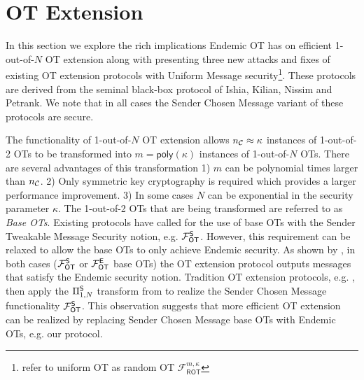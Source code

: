 


\section{OT Extension}


In this section we explore the rich implications Endemic OT has on efficient 1-out-of-$N$ OT extension along with presenting three new attacks and fixes of existing OT extension protocols\cite{C:KelOrsSch15, RSA:OrrOrsSch17} with Uniform Message security\footnote{\cite{C:KelOrsSch15, RSA:OrrOrsSch17} refer to uniform OT as random OT $\mathcal{F}^{m,\kappa}_{\textsf{ROT}}$}. These protocols are derived from the seminal black-box protocol of Ishia, Kilian, Nissim and Petrank\cite{C:IKNP03}. We note that in all cases the Sender Chosen Message variant of these protocols\cite{C:IKNP03, C:KelOrsSch15, RSA:OrrOrsSch17} are secure. %



The functionality of 1-out-of-$N$ OT extension allows ${n_\mathcal{C}}\approx\kappa$ instances of 1-out-of-2 OTs to be transformed into $m=\textsf{poly}(\kappa)$ instances of 1-out-of-$N$ OTs. There are several advantages of this transformation 1) $m$ can be polynomial times larger than ${n_\mathcal{C}}$. 2) Only symmetric key cryptography is required which provides a larger performance improvement. 3) In some cases $N$ can be exponential in the security parameter $\kappa$. The 1-out-of-2 OTs that are being transformed are referred to as \emph{Base OTs}. Existing protocols\cite{C:IKNP03,EC:ALSZ15, C:KelOrsSch15, RSA:OrrOrsSch17} have called for the use of base OTs with the Sender Tweakable Message Security notion, e.g. $\mathcal{F}_{\mathsf{OT}}^\mathsf{S}$. However, this requirement can be relaxed to allow the base OTs to only achieve Endemic security. As shown by , in both cases ($\mathcal{F}_{\mathsf{OT}}^\mathsf{S}$ or $\mathcal{F}_{\mathsf{OT}}^\mathsf{E}$ base OTs) the OT extension protocol outputs messages that satisfy the Endemic security notion.  Tradition OT extension protocols, e.g. \cite{C:IKNP03,EC:ALSZ15, C:KelOrsSch15}, then apply the $\Pi^{\mathsf{S}}_{1,N}$ transform from  to realize the Sender Chosen Message functionality $\mathcal{F}_{\mathsf{OT}}^\mathsf{S}$. This observation suggests that more efficient OT extension can be realized by replacing Sender Chosen Message base OTs with Endemic OTs, e.g. our protocol.

